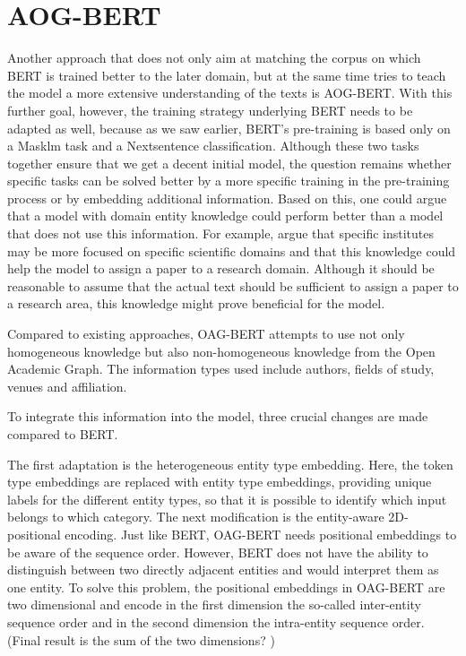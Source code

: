 \section{AOG-BERT}
	Another approach that does not only aim at matching the corpus on which BERT is trained better to the later domain, but at the same time tries to teach the model a more extensive understanding of the texts is AOG-BERT. With this further goal, however, the training strategy underlying BERT needs to be adapted as well, because as we saw earlier, BERT's pre-training is based only on a Masklm task and a Nextsentence classification. Although these two tasks together ensure that we get a decent initial model, the question remains whether specific tasks can be solved better by a more specific training in the pre-training process or by embedding additional information.
	Based on this, one could argue that a model with domain entity knowledge could perform better than a model that does not use this information. For example, \citeauthor{Liu2021} argue that specific institutes may be more focused on specific scientific domains and that this knowledge could help the model to assign a paper to a research domain. Although it should be reasonable to assume that the actual text should be sufficient to assign a paper to a research area, this knowledge might prove beneficial for the model.
	

	Compared to existing approaches, OAG-BERT attempts to use not only homogeneous knowledge but also non-homogeneous knowledge from the Open Academic Graph. The information types used include authors, fields of study, venues and affiliation.
	
	To integrate this information into the model, three crucial changes are made compared to BERT.  
	
	The first adaptation is the heterogeneous entity type embedding. Here, the token type embeddings are replaced with entity type embeddings, providing unique labels for the different entity types, so that it is possible to identify which input belongs to which category.
	The next modification is the entity-aware 2D-positional encoding. Just like BERT, OAG-BERT needs positional embeddings to be aware of the sequence order. However, BERT does not have the ability to distinguish between two directly adjacent entities and would interpret them as one entity. To solve this problem, the positional embeddings in OAG-BERT are two dimensional and encode in the first dimension the so-called inter-entity sequence order and in the second dimension the intra-entity sequence order. (Final result is the sum of the two dimensions? )
	
